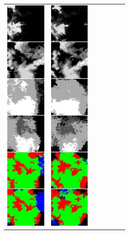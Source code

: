 \begin{figure}[h]
\begin{tabular}{lllllll}
\includegraphics[width=20mm]{abb/prediction/104_cat_maxCont}&
\includegraphics[width=20mm]{abb/prediction/105_cat_maxCont}&

\end{tabular}
\end{figure}
